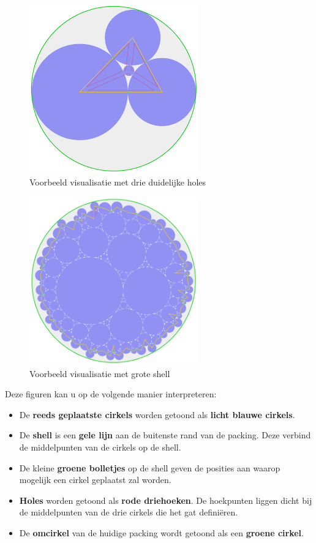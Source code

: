 \documentclass[12pt,a4paper,oneside]{book}
\begin{document}
\begin{figure}
  \centering
  \includegraphics[width=0.65\textwidth]{handleiding-visualisatie-1.png}
  \caption{Voorbeeld visualisatie met drie duidelijke holes} \label{fig:handleiding-visualisatie-1}
\end{figure}

\begin{figure}
  \centering
  \includegraphics[width=0.65\textwidth]{handleiding-visualisatie-2.png}
  \caption{Voorbeeld visualisatie met grote shell} \label{fig:handleiding-visualisatie-2}
\end{figure}

Deze figuren kan u op de volgende manier interpreteren:

\begin{itemize}  
\item De \textbf{reeds geplaatste cirkels} worden getoond als \textbf{licht blauwe cirkels}.
\item De \textbf{shell} is een \textbf{gele lijn} aan de buitenste rand van de packing. Deze verbind de middelpunten van de cirkels op de shell.
\item De kleine \textbf{groene bolletjes} op de shell geven de posities aan waarop mogelijk een cirkel geplaatst zal worden.
\item \textbf{Holes} worden getoond als \textbf{rode driehoeken}. De hoekpunten liggen dicht bij de middelpunten van de drie cirkels die het gat definiëren.
\item De \textbf{omcirkel} van de huidige packing wordt getoond als een \textbf{groene cirkel}.
\end{itemize}
\end{document}
